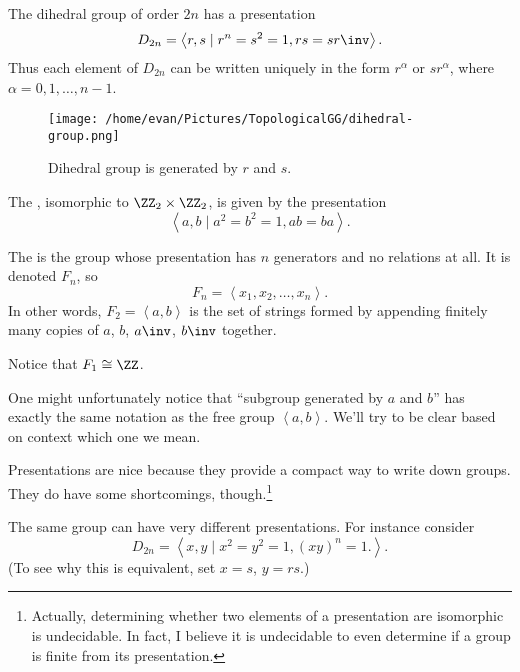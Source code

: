 \begin{example}
	The dihedral group of order $2n$ has a presentation
	\[ D_{2n}
		= \left< r, s \mid r^n = s^2 = 1, rs = sr\inv \right>.
	\]
	Thus each element of $D_{2n}$ can be written uniquely in the form $r^\alpha$
	or $sr^\alpha$, where $\alpha = 0, 1, \dots, n-1$.
\end{example}

\begin{figure}[ht]
	\centering
	\texttt{[image: /home/evan/Pictures/TopologicalGG/dihedral-group.png]}
	\caption{Dihedral group is generated by $r$ and $s$.}
\end{figure}

\begin{example}
	The , isomorphic to $\Zc2 \times \Zc2$, is given by the presentation
	\[ \left< a,b \mid a^2=b^2=1, ab=ba \right>. \]
\end{example}

\begin{example}
	The  is the group
	whose presentation has $n$ generators and no relations at all.
	It is denoted $F_n$, so
	\[
		F_n = \left< x_1, x_2, \dots, x_n \right>.
	\]
	In other words, $F_2 = \left<a,b\right>$ is the set of strings
	formed by appending finitely many copies of $a$, $b$, $a\inv$, $b\inv$ together.
\end{example}
\begin{ques}
	Notice that $F_1 \cong \ZZ$.
\end{ques}
\begin{abuse}
	One might unfortunately notice that ``subgroup generated by $a$ and $b$''
	has exactly the same notation as the free group $\left<a,b\right>$.
	We'll try to be clear based on context which one we mean.
\end{abuse}

Presentations are nice because they provide a compact way to write down groups.
They do have some shortcomings, though.\footnote{
Actually, determining whether two elements of a presentation are isomorphic is undecidable.
In fact, I believe it is undecidable to even determine if a group is finite from its presentation.}

\begin{example}
	The same group can have very different presentations.
	For instance consider
	\[ D_{2n} = \left< x,y \mid x^2=y^2=1, (xy)^n=1. \right>. \]
	(To see why this is equivalent, set $x=s$, $y=rs$.)
\end{example}


